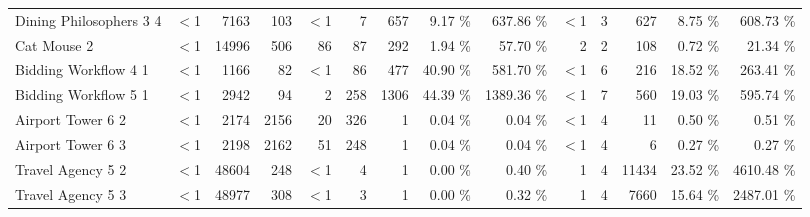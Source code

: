 \begin{tabular}{|l|rrr|rr|rrr|rr|rrr|}
Dining Philosophers 3 4 & $<$1 & 7163 & 103 & $<$1 & 7 & 657 &  9.17 \% &  637.86 \% & $<$1 & 3 & 627&  8.75 \% &  608.73 \% \\ 
  Cat Mouse 2 & $<$1 & 14996 & 506 & 86 & 87 & 292 &  1.94 \% &   57.70 \% & 2 & 2 & 108 & 0.72 \% &   21.34 \% \\ 
  Bidding Workflow 4 1 & $<$1 & 1166 &  82 & $<$1 & 86 & 477 & 40.90 \% &  581.70 \% & $<$1 & 6 & 216 & 18.52 \% &  263.41 \% \\ 
Bidding Workflow 5 1 & $<$1 & 2942 &  94 & 2 & 258 & 1306 & 44.39 \% & 1389.36 \% & $<$1 & 7 & 560 & 19.03 \% &  595.74 \% \\ 
  Airport Tower 6 2 & $<$1 & 2174 & 2156 & 20 & 326 & 1 &  0.04 \% &    0.04 \% & $<$1 & 4 & 11 &  0.50 \% &    0.51 \% \\ 
  Airport Tower 6 3 & $<$1 & 2198 & 2162 & 51 & 248 & 1 &  0.04 \% &    0.04 \% & $<$1 & 4 & 6 &  0.27 \% &    0.27 \% \\ 
  Travel Agency 5 2 & $<$1 & 48604 & 248 & $<$1 & 4 & 1 &  0.00 \% &    0.40 \% & 1 & 4 & 11434 & 23.52 \% & 4610.48 \% \\ 
  Travel Agency 5 3 & $<$1 & 48977 & 308 & $<$1 & 3 & 1 &  0.00 \% &    0.32 \% & 1 & 4 & 7660 & 15.64 \% & 2487.01 \% \\ 
\hline   
\end{tabular}
